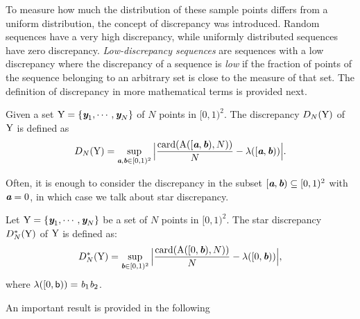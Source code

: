 To measure how much the distribution of these sample points differs from a uniform distribution, the concept of discrepancy was introduced.  
Random sequences have a very high discrepancy, while uniformly distributed sequences have zero discrepancy. 
\textit{Low-discrepancy sequences} are sequences with a low discrepancy \cite{owen2003quasi} where the discrepancy of a sequence is \textit{low} if the fraction of points of the sequence belonging to an arbitrary set is close to the measure of that set.
The definition of discrepancy in more mathematical terms is provided next. 
\begin{definition}
Given a set $\mbox{$\textup{Y}$} = \{\textit{\textbf{y}}_1, \cdots, \textit{\textbf{y}}_N\}$ of $N$ points in $[0,1)^2$. The discrepancy $D_N(\mbox{$\textup{Y}$})$ of $\mbox{$\textup{Y}$}$ is defined as
\begin{equation}
D_N(\mbox{$\textup{Y}$}) = \sup_{\textit{\textbf{a}}, \textit{\textbf{b}}\in[0,1)^2}\Big|\frac{\textrm{card}(\mbox{$\textup{A}$}([\textit{\textbf{a}},\textit{\textbf{b}}), N))}{N}-\lambda([\textit{\textbf{a}}, \textit{\textbf{b}}))\Big|.
\end{equation}
\end{definition} 
Often, it is enough to consider the discrepancy in the subset $[\textit{\textbf{a}},\textit{\textbf{b}})\subseteq[0,1)^2$ with $\textit{\textbf{a}}=0$, in which case we talk about star discrepancy.
 \begin{definition}
Let $\mbox{$\textup{Y}$} = \{\textit{\textbf{y}}_1, \cdots, \textit{\textbf{y}}_N\}$ be a set of $N$ points in $[0,1)^2$. The  star discrepancy $D^*_N(\mbox{$\textup{Y}$})$ of $\mbox{$\textup{Y}$}$ is defined as:
\begin{equation}
D^*_N(\mbox{$\textup{Y}$}) = \sup_{\textit{\textbf{b}}\in[0,1)^2}\Big|\frac{\textrm{card}(\mbox{$\textup{A}$}([0,\textit{\textbf{b}}), N))}{N}-\lambda([0, \textit{\textbf{b}}))\Big|,
\end{equation}
where $\lambda([0, \textsf{b})) = \textit{b}_1\textit{b}_2$. 
\end{definition}
An important result is provided in the following
